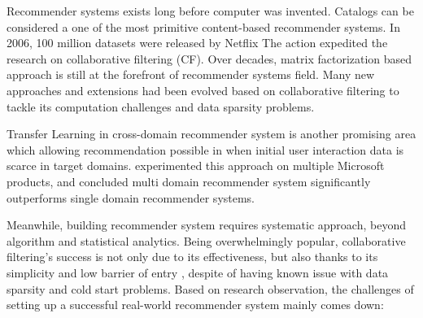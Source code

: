 Recommender systems exists long before computer was invented. Catalogs can be considered a one of the most primitive content-based recommender systems. In 2006, 100 million datasets were released by Netflix \citep{Bennett2007} The action expedited the research on collaborative filtering (CF). Over decades, matrix factorization based approach is still at the forefront of recommender systems field. Many new approaches and extensions had been evolved based on collaborative filtering to tackle its computation challenges and data sparsity problems. 

Transfer Learning \citep{Pan2010} in cross-domain recommender system is another promising area which allowing recommendation possible in when initial user interaction data is scarce in target domains. \citet{Elkahky2015} experimented this approach on multiple Microsoft products, and concluded multi domain recommender system significantly outperforms single domain recommender systems. 

Meanwhile, building recommender system requires systematic approach, beyond algorithm and statistical analytics. Being overwhelmingly popular, collaborative filtering's success is not only due to its effectiveness, but also thanks to its simplicity and low barrier of entry \citep{Amatriain2016}, despite of having known issue with data sparsity and cold start problems. 
Based on research observation, the challenges of setting up a successful real-world recommender system mainly comes down:  





